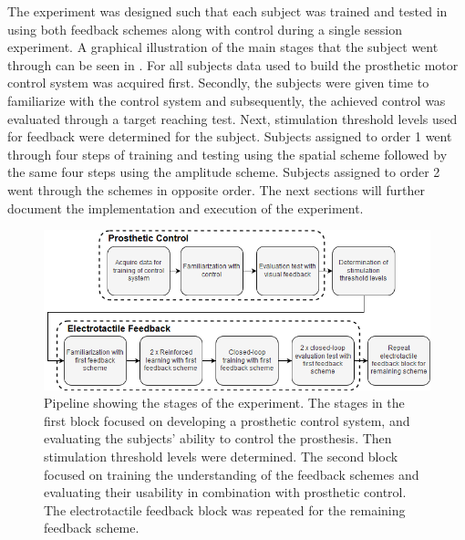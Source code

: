The experiment was designed such that each subject was trained and tested in using both feedback schemes along with control during a single session experiment. A graphical illustration of the main stages that the subject went through can be seen in . For all subjects data used to build the prosthetic motor control system was acquired first. Secondly, the subjects were given time to familiarize with the control system and subsequently, the achieved control was evaluated through a target reaching test. Next, stimulation threshold levels used for feedback were determined for the subject. Subjects assigned to order 1 went through four steps of training and testing using the spatial scheme followed by the same four steps using the amplitude scheme. Subjects assigned to order 2 went through the schemes in opposite order. The next sections will further document the implementation and execution of the experiment.     

\begin{figure}[H]                 
	\includegraphics[width=.95\textwidth]{figures/std_paper}
	\caption{Pipeline showing the stages of the experiment. The stages in the first block focused on developing a prosthetic control system, and evaluating the subjects' ability to control the prosthesis. Then stimulation threshold levels were determined. The second block focused on training the understanding of the feedback schemes and evaluating their usability in combination with prosthetic control. The electrotactile feedback block was repeated for the remaining feedback scheme.}
	\label{fig:std} 
\end{figure}